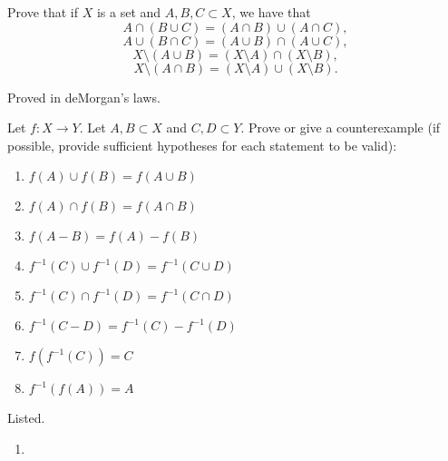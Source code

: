   \begin{exercise}
    Prove that if $X$ is a set and $A,B,C \subset X$, we have that
    \begin{equation}
      A \cap (B \cup C) = (A \cap B) \cup (A \cap C),
    \end{equation}
    \begin{equation}
      A \cup (B \cap C) = (A \cup B) \cap (A \cup C),
    \end{equation}
    \begin{equation}
      X \setminus (A \cup B) = (X \setminus A) \cap (X \setminus B),
    \end{equation}
    \begin{equation}
      X \setminus (A \cap B) = (X \setminus A) \cup (X \setminus B).
    \end{equation}
  \end{exercise}
  \begin{solution}
    Proved in deMorgan's laws. 
  \end{solution}

  \begin{exercise}
    Let $f: X \to Y$. Let $A,B \subset X$ and $C,D \subset Y$. Prove or give a counterexample (if possible, provide sufficient hypotheses for each statement to be valid):
    \begin{enumerate}
      \item $f(A) \cup f(B) = f(A \cup B)$
      \item $f(A) \cap f(B) = f(A \cap B)$
      \item $f(A - B) = f(A) - f(B)$
      \item $f^{-1}(C) \cup f^{-1}(D) = f^{-1}(C \cup D)$
      \item $f^{-1}(C) \cap f^{-1}(D) = f^{-1}(C \cap D)$
      \item $f^{-1}(C - D) = f^{-1}(C) - f^{-1}(D)$
      \item $f(f^{-1}(C)) = C$
      \item $f^{-1}(f(A)) = A$
    \end{enumerate} 
  \end{exercise}
  \begin{solution}
    Listed. 
    \begin{enumerate}
      \item 
    \end{enumerate}
  \end{solution}

